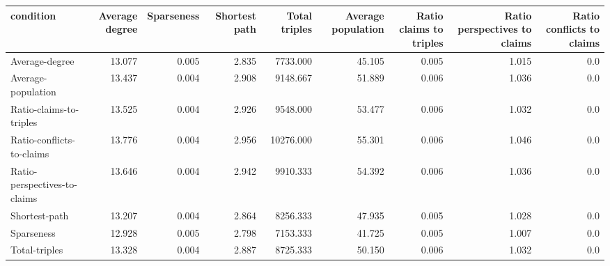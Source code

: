 \begin{tabular}{lrrrrrrrr}
\toprule
                   condition &  Average degree &  Sparseness &  Shortest path &  Total triples &  Average population &  Ratio claims to triples &  Ratio perspectives to claims &  Ratio conflicts to claims \\
\midrule
              Average-degree &          13.077 &       0.005 &          2.835 &       7733.000 &              45.105 &                    0.005 &                         1.015 &                        0.0 \\
          Average-population &          13.437 &       0.004 &          2.908 &       9148.667 &              51.889 &                    0.006 &                         1.036 &                        0.0 \\
     Ratio-claims-to-triples &          13.525 &       0.004 &          2.926 &       9548.000 &              53.477 &                    0.006 &                         1.032 &                        0.0 \\
   Ratio-conflicts-to-claims &          13.776 &       0.004 &          2.956 &      10276.000 &              55.301 &                    0.006 &                         1.046 &                        0.0 \\
Ratio-perspectives-to-claims &          13.646 &       0.004 &          2.942 &       9910.333 &              54.392 &                    0.006 &                         1.036 &                        0.0 \\
               Shortest-path &          13.207 &       0.004 &          2.864 &       8256.333 &              47.935 &                    0.005 &                         1.028 &                        0.0 \\
                  Sparseness &          12.928 &       0.005 &          2.798 &       7153.333 &              41.725 &                    0.005 &                         1.007 &                        0.0 \\
               Total-triples &          13.328 &       0.004 &          2.887 &       8725.333 &              50.150 &                    0.006 &                         1.032 &                        0.0 \\
\bottomrule
\end{tabular}
